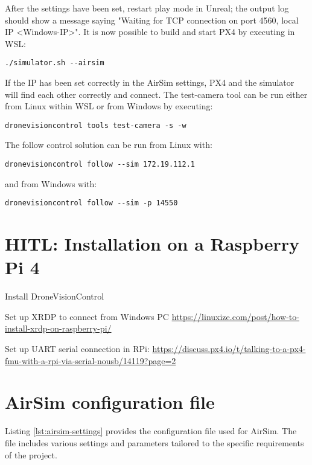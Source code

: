 After the settings have been set, restart play mode in Unreal; the output log should show a message saying "Waiting for TCP connection on port 4560, local IP <Windows-IP>".
It is now possible to build and start PX4 by executing in WSL:
\begin{verbatim}
./simulator.sh --airsim
\end{verbatim}

If the IP has been set correctly in the AirSim settings, 
PX4 and the simulator will find each other correctly and connect.
The test-camera tool can be run either from Linux within WSL or from Windows by executing:
\begin{verbatim}
dronevisioncontrol tools test-camera -s -w
\end{verbatim}

The follow control solution can be run from Linux with:
\begin{verbatim}
dronevisioncontrol follow --sim 172.19.112.1
\end{verbatim}
and from Windows with:
\begin{verbatim}
dronevisioncontrol follow --sim -p 14550
\end{verbatim}

\section{HITL: Installation on a Raspberry Pi 4}
\label{app:install-dronecontrol-rpi}


Install DroneVisionControl
        
Set up XRDP to connect from Windows PC
\url{https://linuxize.com/post/how-to-install-xrdp-on-raspberry-pi/}

Set up UART serial connection in RPi: 
\url{https://discuss.px4.io/t/talking-to-a-px4-fmu-with-a-rpi-via-serial-nousb/14119?page=2}


\section{AirSim configuration file}
\label{app:airsim-config}

Listing \ref{lst:airsim-settings} provides the configuration file used for AirSim. The file includes various settings and parameters tailored to the specific requirements of the project.

